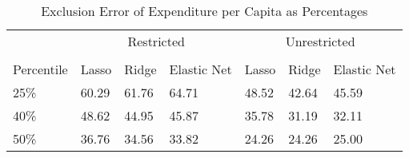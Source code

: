 
\begin{table}[h]
    \caption{Exclusion Error of Expenditure per Capita as Percentages}
    \centering
    \begin{tabular}{lllllll}
        \toprule
        {} & \multicolumn{3}{c}{Restricted} & \multicolumn{3}{c}{Unrestricted}\\
        \cmidrule(lr){2-4} \cmidrule(lr){5-7} \\
        Percentile & Lasso & Ridge & Elastic Net  & Lasso & Ridge & Elastic Net \\
        \midrule
        25\%        &   60.29 &  61.76 &        64.71  &   48.52 &  42.64 &        45.59\\
        40\%        &   48.62 &  44.95 &        45.87  &   35.78 &  31.19 &        32.11\\
        50\%        &   36.76 &  34.56 &        33.82  &   24.26 &  24.26 &        25.00\\
        \bottomrule
    \end{tabular}
    \label{table:5}
\end{table}